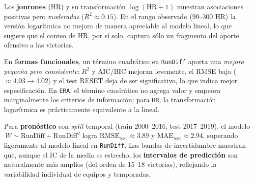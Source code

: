 \documentclass[10pt]{article}
\begin{document}
Los \textbf{jonrones} (HR) y su transformación \(\log(\text{HR}+1)\) muestran asociaciones positivas pero \textit{moderadas} (\(R^2\approx 0.15\)). En el rango observado (90–300 HR) la versión logarítmica no mejora de manera apreciable al modelo lineal, lo que sugiere que el conteo de HR, por sí solo, captura sólo un fragmento del aporte ofensivo a las victorias.

En \textbf{formas funcionales}, un término cuadrático en \texttt{RunDiff} aporta una \textit{mejora pequeña pero consistente}: \(R^2\) y AIC/BIC mejoran levemente, el RMSE baja (\(\approx 4.03 \rightarrow 4.02\)) y el test RESET deja de ser significativo, lo que indica mejor especificación. En \texttt{ERA}, el término cuadrático no agrega valor y empeora marginalmente los criterios de información; para \texttt{HR}, la transformación logarítmica es prácticamente equivalente a la lineal.

Para \textbf{pronóstico} con \textit{split} temporal (train 2000–2016, test 2017–2019), el modelo \(\,W \sim \text{RunDiff} + \text{RunDiff}^2\) logra \(\text{RMSE}_{\text{test}}\approx 3.89\) y \(\text{MAE}_{\text{test}}\approx 2.94\), superando ligeramente al modelo lineal en \texttt{RunDiff}. Las bandas de incertidumbre muestran que, aunque el IC de la media es estrecho, los \textbf{intervalos de predicción} son naturalmente más amplios (del orden de 15–18 victorias), reflejando la variabilidad individual de equipos y temporadas.
\end{document}
